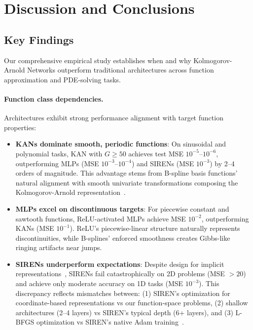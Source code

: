 \documentclass[11pt,a4paper]{article}
\begin{document}
\section{Discussion and Conclusions}
\label{sec:discussion}

\subsection{Key Findings}

Our comprehensive empirical study establishes when and why Kolmogorov-Arnold Networks outperform traditional architectures across function approximation and PDE-solving tasks.

\paragraph{Function class dependencies.} Architectures exhibit strong performance alignment with target function properties:
\begin{itemize}
    \item \textbf{KANs dominate smooth, periodic functions}: On sinusoidal and polynomial tasks, KAN with $G \geq 50$ achieves test MSE $10^{-5}$--$10^{-6}$, outperforming MLPs (MSE $10^{-3}$--$10^{-4}$) and SIRENs (MSE $10^{-3}$) by 2--4 orders of magnitude. This advantage stems from B-spline basis functions' natural alignment with smooth univariate transformations composing the Kolmogorov-Arnold representation~\citep{liu2024kan}.
    \item \textbf{MLPs excel on discontinuous targets}: For piecewise constant and sawtooth functions, ReLU-activated MLPs achieve MSE $10^{-2}$, outperforming KANs (MSE $10^{-1}$). ReLU's piecewise-linear structure naturally represents discontinuities, while B-splines' enforced smoothness creates Gibbs-like ringing artifacts near jumps.
    \item \textbf{SIRENs underperform expectations}: Despite design for implicit representations~\citep{sitzmann2020implicit}, SIRENs fail catastrophically on 2D problems (MSE $>20$) and achieve only moderate accuracy on 1D tasks (MSE $10^{-3}$). This discrepancy reflects mismatches between: (1) SIREN's optimization for coordinate-based representations vs our function-space problems, (2) shallow architectures (2--4 layers) vs SIREN's typical depth (6+ layers), and (3) L-BFGS optimization vs SIREN's native Adam training~\citep{sitzmann2020implicit, kingma2015adam}.
\end{itemize}
\end{document}
